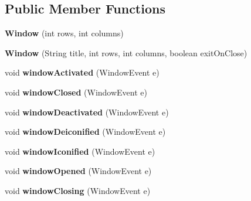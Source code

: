\subsection*{Public Member Functions}
\begin{DoxyCompactItemize}
\item 
\hypertarget{classbattleShip_1_1Window_a726b41baa3e2daf1eef7586eec390612}{{\bfseries Window} (int rows, int columns)}\label{classbattleShip_1_1Window_a726b41baa3e2daf1eef7586eec390612}

\item 
\hypertarget{classbattleShip_1_1Window_ac65bc743a1078760a9330078445ac6f7}{{\bfseries Window} (String title, int rows, int columns, boolean exit\-On\-Close)}\label{classbattleShip_1_1Window_ac65bc743a1078760a9330078445ac6f7}

\item 
\hypertarget{classbattleShip_1_1Window_a214a8387f89e8bd3f678c605416d4b3f}{void {\bfseries window\-Activated} (Window\-Event e)}\label{classbattleShip_1_1Window_a214a8387f89e8bd3f678c605416d4b3f}

\item 
\hypertarget{classbattleShip_1_1Window_afe7561ad4e2cf55deeeb41033ab4d998}{void {\bfseries window\-Closed} (Window\-Event e)}\label{classbattleShip_1_1Window_afe7561ad4e2cf55deeeb41033ab4d998}

\item 
\hypertarget{classbattleShip_1_1Window_a111c1da295b878bdb046c6aadc010e84}{void {\bfseries window\-Deactivated} (Window\-Event e)}\label{classbattleShip_1_1Window_a111c1da295b878bdb046c6aadc010e84}

\item 
\hypertarget{classbattleShip_1_1Window_a6f114e4e446e31e6a772172e3c63ecdd}{void {\bfseries window\-Deiconified} (Window\-Event e)}\label{classbattleShip_1_1Window_a6f114e4e446e31e6a772172e3c63ecdd}

\item 
\hypertarget{classbattleShip_1_1Window_a20e8082132fcfaa5027a83284eb0abac}{void {\bfseries window\-Iconified} (Window\-Event e)}\label{classbattleShip_1_1Window_a20e8082132fcfaa5027a83284eb0abac}

\item 
\hypertarget{classbattleShip_1_1Window_a40bf9fda41c424ca5bf52d371da79a5f}{void {\bfseries window\-Opened} (Window\-Event e)}\label{classbattleShip_1_1Window_a40bf9fda41c424ca5bf52d371da79a5f}

\item 
\hypertarget{classbattleShip_1_1Window_ae2826f39804482199ccb2b3f9ee8ed21}{void {\bfseries window\-Closing} (Window\-Event e)}\label{classbattleShip_1_1Window_ae2826f39804482199ccb2b3f9ee8ed21}


\end{DoxyCompactItemize}
